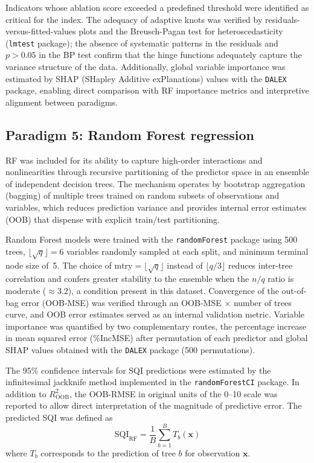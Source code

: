 \documentclass[pdflatex,sn-basic]{sn-jnl}%
\begin{document}
Indicators whose ablation score exceeded a predefined threshold were identified as critical for the index. The adequacy of adaptive knots was verified by residuals-versus-fitted-values plots and the Breusch-Pagan test for heteroscedasticity (\texttt{lmtest} package); the absence of systematic patterns in the residuals and $p > 0.05$ in the BP test confirm that the hinge functions adequately capture the variance structure of the data. Additionally, global variable importance was estimated by SHAP (SHapley Additive exPlanations) values with the \texttt{DALEX} package, enabling direct comparison with RF importance metrics and interpretive alignment between paradigms.

\subsection{Paradigm 5: Random Forest regression}\label{subsec:rf}

RF \citep{Breiman2001} was included for its ability to capture high-order interactions and nonlinearities through recursive partitioning of the predictor space in an ensemble of independent decision trees. The mechanism operates by bootstrap aggregation (bagging) of multiple trees trained on random subsets of observations and variables, which reduces prediction variance and provides internal error estimates (OOB) that dispense with explicit train/test partitioning.

Random Forest models were trained with the \texttt{randomForest} package using 500 trees, $\lfloor \sqrt{q} \rfloor = 6$ variables randomly sampled at each split, and minimum terminal node size of~5. The choice of $\text{mtry} = \lfloor \sqrt{q} \rfloor$ instead of $\lfloor q/3 \rfloor$ reduces inter-tree correlation and confers greater stability to the ensemble when the $n/q$ ratio is moderate ($\approx 3.2$), a condition present in this dataset. Convergence of the out-of-bag error (OOB-MSE) was verified through an OOB-MSE $\times$ number of trees curve, and OOB error estimates served as an internal validation metric. Variable importance was quantified by two complementary routes, the percentage increase in mean squared error (\%IncMSE) after permutation of each predictor and global SHAP values obtained with the \texttt{DALEX} package (500 permutations).

The 95\% confidence intervals for SQI predictions were estimated by the infinitesimal jackknife method \citep{Wager2014} implemented in the \texttt{randomForestCI} package. In addition to $R^2_{\text{OOB}}$, the OOB-RMSE in original units of the 0--10 scale was reported to allow direct interpretation of the magnitude of predictive error. The predicted SQI was defined as
\begin{equation}
\text{SQI}_{\text{RF}} = \frac{1}{B}\sum_{b=1}^{B} T_b(\mathbf{x})
\label{eq:rf}
\end{equation}
where $T_b$ corresponds to the prediction of tree $b$ for observation $\mathbf{x}$.
\end{document}
